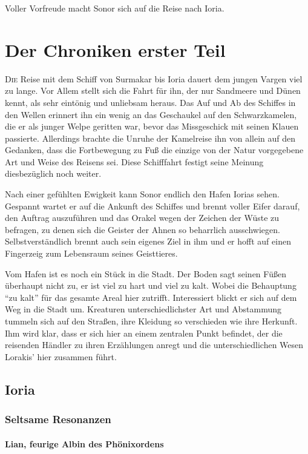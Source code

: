 \documentclass[a4paper]{scrreprt}
\def\capitalsfont{\usefont{U}{AnnSton}{xl}{n}\selectfont}
\newcommand{\capital}[2]{\lettrine[lines=8]{\capitalsfont #1}{#2}}
\begin{document}
Voller Vorfreude macht Sonor sich auf die Reise nach Ioria.


\part{Der Chroniken erster Teil}
\capital{D}{ie} Reise mit dem Schiff von Surmakar bis Ioria dauert dem jungen Vargen viel zu lange. 
Vor Allem stellt sich die Fahrt für ihn, der nur Sandmeere und Dünen kennt, als sehr eintönig und unliebsam heraus.
Das Auf und Ab des Schiffes in den Wellen erinnert ihn ein wenig an das Geschaukel auf den Schwarzkamelen, die er als junger Welpe geritten war, bevor das Missgeschick mit seinen Klauen passierte.
Allerdings brachte die Unruhe der Kamelreise ihn von allein auf den Gedanken, dass die Fortbewegung zu Fuß die einzige von der Natur vorgegebene Art und Weise des Reisens sei.
Diese Schifffahrt festigt seine Meinung diesbezüglich noch weiter.
 
Nach einer gefühlten Ewigkeit kann Sonor endlich den Hafen Iorias sehen.
Gespannt wartet er auf die Ankunft des Schiffes und brennt voller Eifer darauf, den Auftrag auszuführen und das Orakel wegen der Zeichen der Wüste zu befragen, zu denen sich die Geister der Ahnen so beharrlich ausschwiegen. Selbstverständlich brennt auch sein eigenes Ziel in ihm und er hofft auf einen Fingerzeig zum Lebensraum seines Geisttieres.

Vom Hafen ist es noch ein Stück in die Stadt. Der Boden sagt seinen Füßen überhaupt nicht zu, er ist viel zu hart und viel zu kalt. 
Wobei die Behauptung \enquote{zu kalt} für das gesamte Areal hier zutrifft.
Interessiert blickt er sich auf dem Weg in die Stadt um. Kreaturen unterschiedlichster Art und Abstammung tummeln sich auf den Straßen, ihre Kleidung so verschieden wie ihre Herkunft. Ihm wird klar, dass er sich hier an einem zentralen Punkt befindet, der die reisenden Händler zu ihren Erzählungen anregt und die unterschiedlichen Wesen Lorakis' hier zusammen führt. 

\chapter[13. November 2016]{Ioria}

\section{Seltsame Resonanzen}
\subsection{Lian, feurige Albin des Phönixordens}
\end{document}
